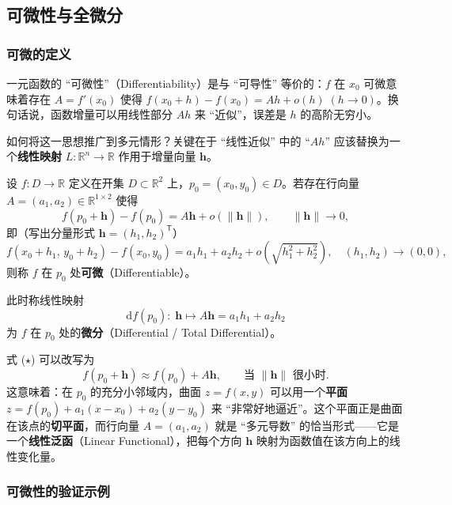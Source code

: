 \documentclass[lang=cn,11pt]{elegantbook}
\begin{document}
\subsection{可微性与全微分}

\subsubsection{可微的定义}

一元函数的 ``可微性''（Differentiability）是与 ``可导性'' 等价的：$f$ 在 $x_0$ 可微意味着存在 $A=f'(x_0)$ 使得 $f(x_0+h)-f(x_0)=Ah+o(h)\;(h\to 0)$。换句话说，函数增量可以用线性部分 $Ah$ 来 ``近似''，误差是 $h$ 的高阶无穷小。

如何将这一思想推广到多元情形？关键在于 ``线性近似'' 中的 ``$A h$'' 应该替换为一个\textbf{线性映射} $L:\mathbb R^n\to\mathbb R$ 作用于增量向量 $\boldsymbol h$。

\begin{definition}[二元函数的可微性] \label{def:differentiability}
设 $f:D\to\mathbb R$ 定义在开集 $D\subset\mathbb R^2$ 上，$p_0=(x_0,y_0)\in D$。若存在行向量 $A=(a_1,a_2)\in\mathbb R^{1\times 2}$ 使得
\[
f(p_0+\boldsymbol h)-f(p_0)=A\boldsymbol h+o(\|\boldsymbol h\|),\qquad \|\boldsymbol h\|\to 0, \tag{$\star$}
\]
即（写出分量形式 $\boldsymbol h=(h_1,h_2)^{\mathsf T}$）
\[
f(x_0+h_1,\,y_0+h_2)-f(x_0,y_0) =a_1h_1+a_2h_2+o\!\left(\sqrt{h_1^2+h_2^2}\right), \quad(h_1,h_2)\to(0,0),
\]
则称 $f$ 在 $p_0$ 处\textbf{可微}（Differentiable）。

此时称线性映射
\[
\mathrm{d}f(p_0):\;\boldsymbol h\longmapsto A\boldsymbol h=a_1h_1+a_2h_2
\]
为 $f$ 在 $p_0$ 处的\textbf{微分}（Differential / Total Differential）。
\end{definition}

\begin{note}
式 ($\star$) 可以改写为
\[
f(p_0+\boldsymbol h)\approx f(p_0)+A\boldsymbol h, \qquad\text{当 }\|\boldsymbol h\|\text{ 很小时}.
\]
这意味着：在 $p_0$ 的充分小邻域内，曲面 $z=f(x,y)$ 可以用一个\textbf{平面} $z=f(p_0)+a_1(x-x_0)+a_2(y-y_0)$ 来 ``非常好地逼近''。这个平面正是曲面在该点的\textbf{切平面}，而行向量 $A=(a_1,a_2)$ 就是 ``多元导数'' 的恰当形式——它是一个\textbf{线性泛函}（Linear Functional），把每个方向 $\boldsymbol h$ 映射为函数值在该方向上的线性变化量。
\end{note}

\subsubsection*{可微性的验证示例}
\end{document}
